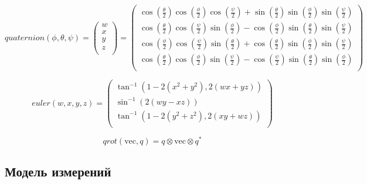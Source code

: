 \documentclass[12pt,a4paper]{article}
\begin{document}
\begin{equation}
    \label{eq:quaternion}
    quaternion(\phi ,\theta ,\psi )=\left(
    \begin{array}{c}
    w \\
    x \\
    y \\
    z \\
    \end{array}
    \right)=\left(
    \begin{array}{c}
    \cos \left(\frac{\theta }{2}\right) \cos \left(\frac{\phi }{2}\right) \cos \left(\frac{\psi }{2}\right)+\sin \left(\frac{\theta }{2}\right) \sin \left(\frac{\phi }{2}\right) \sin \left(\frac{\psi }{2}\right) \\
    \cos \left(\frac{\theta }{2}\right) \cos \left(\frac{\psi }{2}\right) \sin \left(\frac{\phi }{2}\right)-\cos \left(\frac{\phi }{2}\right) \sin \left(\frac{\theta }{2}\right) \sin \left(\frac{\psi }{2}\right) \\
    \cos \left(\frac{\phi }{2}\right) \cos \left(\frac{\psi }{2}\right) \sin \left(\frac{\theta }{2}\right)+\cos \left(\frac{\theta }{2}\right) \sin \left(\frac{\phi }{2}\right) \sin \left(\frac{\psi }{2}\right) \\
    \cos \left(\frac{\theta }{2}\right) \cos \left(\frac{\phi }{2}\right) \sin \left(\frac{\psi }{2}\right)-\cos \left(\frac{\psi }{2}\right) \sin \left(\frac{\theta }{2}\right) \sin \left(\frac{\phi }{2}\right) \\
    \end{array}
    \right)
\end{equation}

\begin{equation}
    \label{eq:euler}
    euler(w,x,y,z)=\left(
    \begin{array}{c}
    \tan ^{-1}\left(1-2 \left(x^2+y^2\right),2 (w x+y z)\right) \\
    \sin ^{-1}(2 (w y-x z)) \\
    \tan ^{-1}\left(1-2 \left(y^2+z^2\right),2 (x y+w z)\right) \\
    \end{array}
    \right)
\end{equation}

\begin{equation}
    \label{eq:qrot}
    qrot(\text{vec},q)=q\otimes \text{vec}\otimes q^*
\end{equation}

\subsection{Модель измерений}
\end{document}
